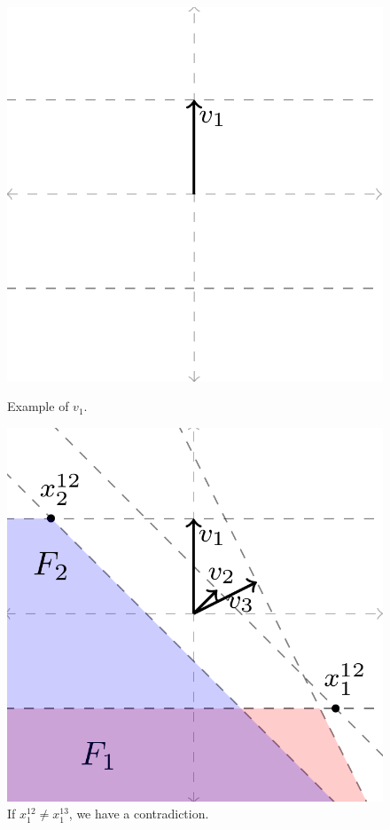 \documentclass[anon]{colt2020} %
\begin{document}
\begin{figure}
	\begin{minipage}{0.45\linewidth}
		\centering
		\includegraphics[width=0.9\linewidth]{tikz/v1}
		\caption{Example of $v_1$.}
		\label{fig:v1}
	\end{minipage}
	\hfill
	\begin{minipage}{0.45\linewidth}
		\centering
		\includegraphics[width=0.9\linewidth]{tikz/qp-must-intersect-line-same-spot}
		\caption{If $x^{12}_1 \neq x^{13}_1$, we have a contradiction.}
		\label{fig:qp-must-intersect-line-same-spot}
	\end{minipage}
\end{figure}
\end{document}

